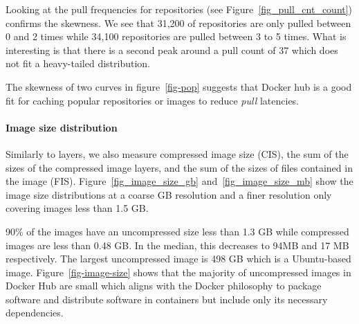 Looking at the pull frequencies for repositories (see Figure~\ref{fig_pull_cnt_count})
confirms the skewness. We see that 31,200 of repositories are only pulled between 0 and
2 times while 34,100 repositories are pulled between 3 to 5 times. What is interesting is
that there is a second peak around a pull count of 37 which does not fit a heavy-tailed
distribution. 


The skewness of two curves in figure~\ref{fig-pop} suggests that Docker hub is
a good fit for caching popular repositories or images to
reduce \textit{pull} latencies.


\paragraph{Image size distribution}
\label{sec:image-size}





Similarly to layers, we also measure compressed image size
(CIS), \ie the sum of the sizes of the compressed image layers, and the sum of the
sizes of files contained in the image (FIS). Figure~\ref{fig_image_size_gb}
and~\ref{fig_image_size_mb} show the image size distributions at a coarse GB resolution
and a finer resolution only covering images less than 1.5 GB.

90\% of the images have an uncompressed size less than 1.3 GB while compressed images
are less than 0.48 GB. In the median, this decreases to 94MB and 17 MB respectively.
The largest uncompressed image is 498 GB which is a Ubuntu-based image.
Figure~\ref{fig-image-size} shows that the majority of uncompressed images in Docker Hub are
small which aligns with the Docker philosophy to package software and distribute
software in containers but include only its necessary dependencies.


